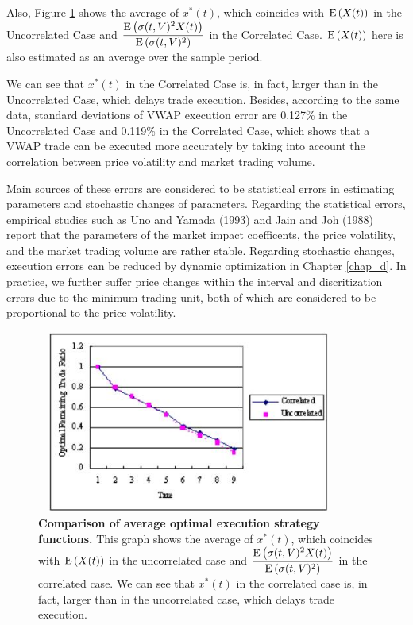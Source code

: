 Also, Figure \ref{fg_s4} shows the average of $x^*(t)$, which coincides with ${\mathrm{E}}\left( X(t) \right)$ in the Uncorrelated Case and $\displaystyle \frac{{\mathrm{E}}\left( \sigma(t,V)^2X(t) \right)}{{\mathrm{E}}\left( \sigma(t,V)^2 \right)}$ in the Correlated Case.  ${\mathrm{E}}\left( X(t) \right)$ here is also estimated as an average over the sample period.  

We can see that $x^*(t)$ in the Correlated Case is, in fact, larger than in the Uncorrelated Case, which delays trade execution.  Besides, according to the same data, standard deviations of VWAP execution error are 0.127\% in the Uncorrelated Case and 0.119\% in the Correlated Case, which shows that a VWAP trade can be executed more accurately by taking into account the correlation between price volatility and market trading volume.

Main sources of these errors are considered to be statistical errors in estimating parameters and stochastic changes of parameters.  Regarding the statistical errors, empirical studies such as Uno and Yamada (1993) and Jain and Joh (1988) report that the parameters of the market impact coefficents, the price volatility, and the market trading volume are rather stable.  Regarding stochastic changes, execution errors can be reduced by dynamic optimization in Chapter \ref{chap_d}.  In practice, we further suffer price changes within the interval and discritization errors due to the minimum trading unit, both of which are considered to be proportional to the price volatility.

\begin{figure}[htbp]
\begin{center}
\includegraphics[width=10cm,height=6cm]{fg_s4n.png}
\end{center}
\caption[Comparison of average optimal execution strategy functions]
{{\bf Comparison of average optimal execution strategy functions.}
 \quad This graph shows the average of $x^*(t)$, which coincides with ${\mathrm{E}}\left( X(t) \right)$ in the uncorrelated case and
$\displaystyle \frac{{\mathrm{E}}\left( \sigma(t,V)^2X(t) \right)}{{\mathrm{E}}\left( \sigma(t,V)^2 \right)}$ in the correlated case.
 We can see that $x^*(t)$ in the correlated case is, in fact, larger than in the uncorrelated case, which delays trade
execution.}\label{fg_s4}
\end{figure}


